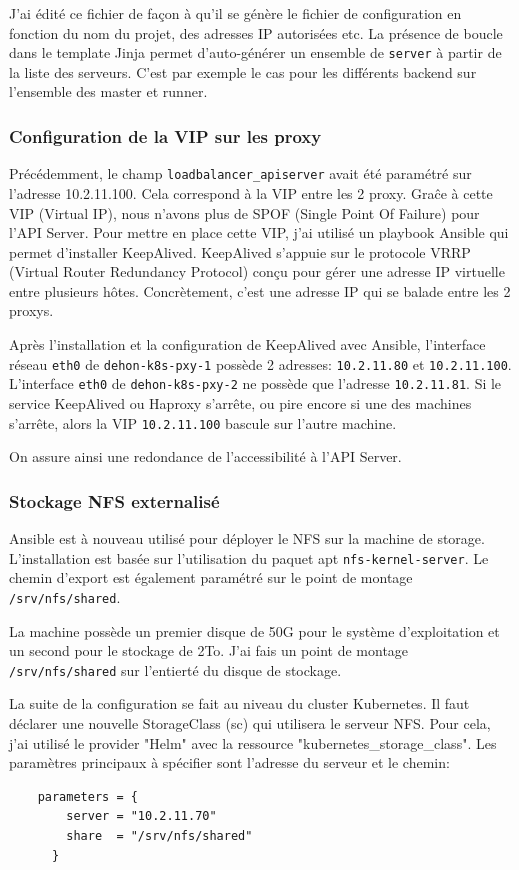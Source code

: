 \documentclass[12pt]{article}
\begin{document}
J'ai édité ce fichier de façon à qu'il se génère le fichier de configuration en fonction du nom du projet, des adresses IP autorisées etc.
La présence de boucle dans le template Jinja permet d'auto-générer un ensemble de \verb|server| à partir de la liste des serveurs.
C'est par exemple le cas pour les différents backend sur l'ensemble des master et runner.

\subsubsection{Configuration de la VIP sur les proxy}
Précédemment, le champ \verb|loadbalancer_apiserver| avait été paramétré sur l'adresse 10.2.11.100.
Cela correspond à la VIP entre les 2 proxy.
Graĉe à cette VIP (Virtual IP), nous n'avons plus de SPOF (Single Point Of Failure) pour l'API Server.
Pour mettre en place cette VIP, j'ai utilisé un playbook Ansible qui permet d'installer KeepAlived.
KeepAlived s'appuie sur le protocole VRRP (Virtual Router Redundancy Protocol) conçu pour gérer une adresse IP virtuelle entre plusieurs hôtes.
Concrètement, c'est une adresse IP qui se balade entre les 2 proxys.

Après l'installation et la configuration de KeepAlived avec Ansible, l'interface réseau \verb|eth0| de \verb|dehon-k8s-pxy-1| possède 2 adresses: \verb|10.2.11.80| et \verb|10.2.11.100|.
L'interface \verb|eth0| de \verb|dehon-k8s-pxy-2| ne possède que l'adresse \verb|10.2.11.81|.
Si le service KeepAlived ou Haproxy s'arrête, ou pire encore si une des machines s'arrête, alors la VIP \verb|10.2.11.100| bascule sur l'autre machine.

On assure ainsi une redondance de l'accessibilité à l'API Server.

\subsubsection{Stockage NFS externalisé}
Ansible est à nouveau utilisé pour déployer le NFS sur la machine de storage.
L'installation est basée sur l'utilisation du paquet apt \verb|nfs-kernel-server|.
Le chemin d'export est également paramétré sur le point de montage \verb|/srv/nfs/shared|.

La machine possède un premier disque de 50G pour le système d'exploitation et un second pour le stockage de 2To.
J'ai fais un point de montage \verb|/srv/nfs/shared| sur l'entierté du disque de stockage.

La suite de la configuration se fait au niveau du cluster Kubernetes.
Il faut déclarer une nouvelle StorageClass (sc) qui utilisera le serveur NFS.
Pour cela, j'ai utilisé le provider "Helm" avec la ressource "kubernetes\_storage\_class".
Les paramètres principaux à spécifier sont l'adresse du serveur et le chemin:
\begin{verbatim}
    parameters = {
        server = "10.2.11.70"
        share  = "/srv/nfs/shared"
      }
\end{verbatim}
\end{document}
